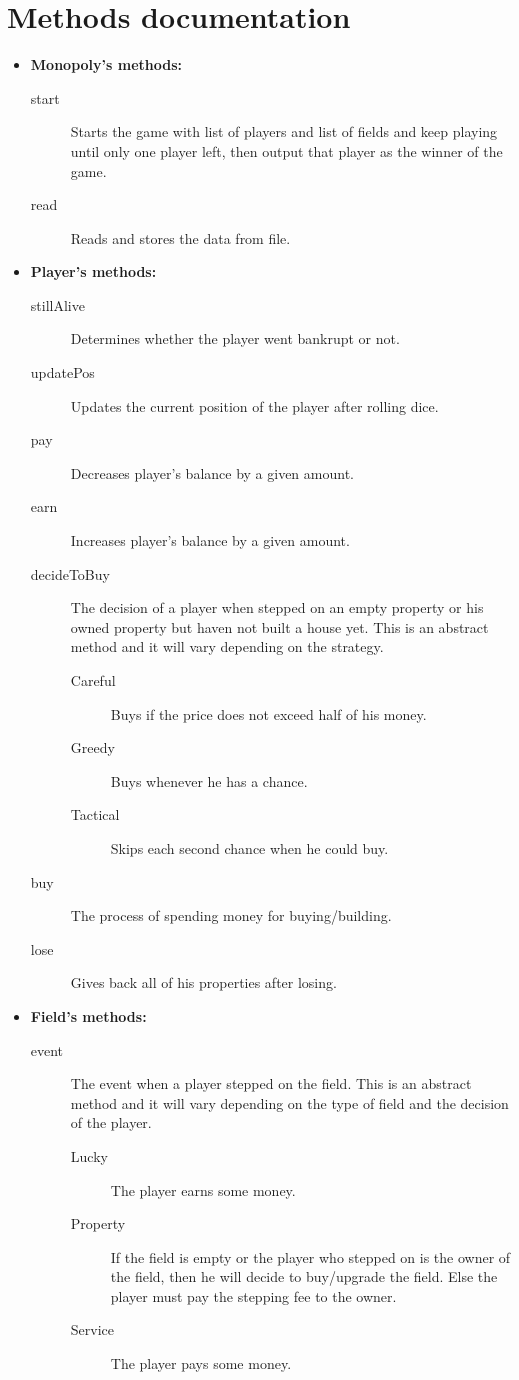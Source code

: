 \documentclass[a4paper, 12pt]{report}
\begin{document}
\chapter{Methods documentation}
\begin{itemize}
\item \textbf{Monopoly's methods:}
		\begin{description}
			\item[start] Starts the game with list of players and list of fields and keep playing until only one player left, then output that player as the winner of the game.
			\item[read] Reads and stores the data from file.
		\end{description}
\item \textbf{Player's methods:}
		\begin{description}
			\item[stillAlive] Determines whether the player went bankrupt or not.
			\item[updatePos] Updates the current position of the player after rolling dice.
			\item[pay] Decreases player's balance by a given amount.
			\item[earn] Increases player's balance by a given amount.
			\item[decideToBuy] The decision of a player when stepped on an empty property or his owned property but haven not built a house yet. This is an abstract method and it will vary depending on the strategy.
				\begin{description}
					\item[Careful] Buys if the price does not exceed half of his money.
					\item[Greedy] Buys whenever he has a chance.
					\item[Tactical] Skips each second chance when he could buy.
				\end{description}
			\item[buy] The process of spending money for buying/building.
			\item[lose] Gives back all of his properties after losing.
		\end{description}
\newpage
\item \textbf{Field's methods:}
		\begin{description}
			\item[event] The event when a player stepped on the field. This is an abstract method and it will vary depending on the type of field and the decision of the player.
				\begin{description}
					\item[Lucky] The player earns some money.
					\item[Property] If the field is empty or the player who stepped on is the owner of the field, then he will decide to buy/upgrade the field. Else the player must pay the stepping fee to the owner.
					\item[Service] The player pays some money.
				\end{description}
		\end{description}
\end{itemize}
\end{document}
